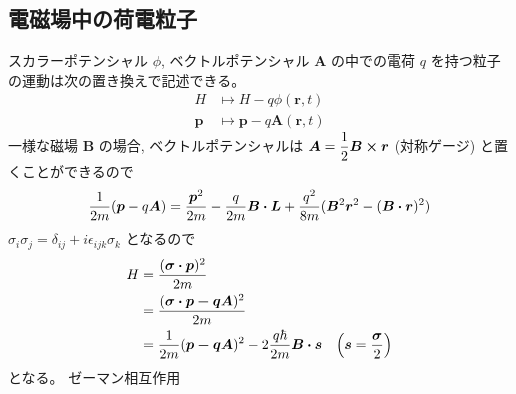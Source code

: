 \documentclass[uplatex,dvipdfmx,a4paper,11pt]{jlreq}
\newcommand{\rr}{\bm{r}}
\theoremstyle{definition}
\begin{document}
\subsection{電磁場中の荷電粒子}
スカラーポテンシャル $\phi$, ベクトルポテンシャル $\bm{A}$ の中での電荷 $q$ を持つ粒子の運動は次の置き換えで記述できる。
\begin{align}
  H      & \mapsto H - q\phi(\rr, t)        \\
  \bm{p} & \mapsto \bm{p} - q\bm{A}(\rr, t)
\end{align}
一様な磁場 $\bm{B}$ の場合, ベクトルポテンシャルは $\bm{A} = \dfrac{1}{2}\bm{B}\cross\rr$ (対称ゲージ) と置くことができるので
\begin{align}
  \frac{1}{2m}(\bm{p} - q\bm{A}) = \frac{\bm{p}^2}{2m} - \frac{q}{2m}\bm{B}\vdot\bm{L} + \frac{q^2}{8m}(\bm{B}^2\rr^2 - (\bm{B}\vdot\rr)^2)
\end{align}
$\sigma_i\sigma_j = \delta_{ij} + i\epsilon_{ijk}\sigma_k$ となるので
\begin{align}
  H & = \frac{(\bm{\sigma}\vdot\bm{p})^2}{2m}                                                                         \\
    & = \frac{(\bm{\sigma}\vdot\bm{p - q\bm{A}})^2}{2m}                                                               \\
    & = \frac{1}{2m}(\bm{p - q\bm{A}})^2 - 2\frac{q\hbar}{2m}\bm{B}\vdot\bm{s} & \qty(\bm{s} = \frac{\bm{\sigma}}{2})
\end{align}
となる。
ゼーマン相互作用
\end{document}
